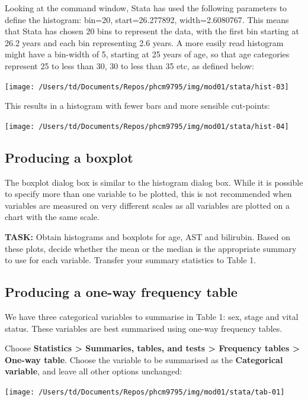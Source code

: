 \documentclass[
]{memoir}
\begin{document}
Looking at the command window, Stata has used the following parameters to define the histogram: bin=20, start=26.277892, width=2.6080767. This means that Stata has chosen 20 bins to represent the data, with the first bin starting at 26.2 years and each bin representing 2.6 years. A more easily read histogram might have a bin-width of 5, starting at 25 years of age, so that age categories represent 25 to less than 30, 30 to less than 35 etc, as defined below:

\texttt{[image: /Users/td/Documents/Repos/phcm9795/img/mod01/stata/hist-03]}

This results in a histogram with fewer bars and more sensible cut-points:

\texttt{[image: /Users/td/Documents/Repos/phcm9795/img/mod01/stata/hist-04]}

\hypertarget{producing-a-boxplot}{%
\subsection{Producing a boxplot}\label{producing-a-boxplot}}

The boxplot dialog box is similar to the histogram dialog box. While it is possible to specify more than one variable to be plotted, this is not recommended when variables are measured on very different scales as all variables are plotted on a chart with the same scale.

\textbf{TASK:} Obtain histograms and boxplots for age, AST and bilirubin. Based on these plots, decide whether the mean or the median is the appropriate summary to use for each variable. Transfer your summary statistics to Table 1.

\hypertarget{producing-a-one-way-frequency-table}{%
\subsection{Producing a one-way frequency table}\label{producing-a-one-way-frequency-table}}

We have three categorical variables to summarise in Table 1: sex, stage and vital status. These variables are best summarised using one-way frequency tables.

Choose \textbf{Statistics \textgreater{} Summaries, tables, and tests \textgreater{} Frequency tables \textgreater{} One-way table}. Choose the variable to be summarised as the \textbf{Categorical variable}, and leave all other options unchanged:

\texttt{[image: /Users/td/Documents/Repos/phcm9795/img/mod01/stata/tab-01]}
\end{document}
